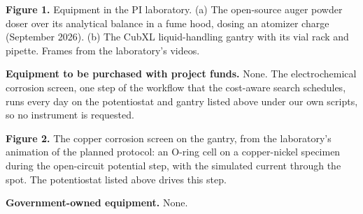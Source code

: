 \textbf{Figure 1.} Equipment in the PI laboratory. (a) The open-source auger
powder doser over its analytical balance in a fume hood, dosing an atomizer
charge (September 2026). (b) The CubXL liquid-handling gantry with its vial
rack and pipette. Frames from the laboratory's videos.

\textbf{Equipment to be purchased with project funds.} None. The
electrochemical corrosion screen, one step of the workflow that the
cost-aware search schedules, runs every day on the potentiostat and gantry
listed above under our own scripts, so no instrument is requested.

\textbf{Figure 2.} The copper corrosion screen on the gantry, from the
laboratory's animation of the planned protocol: an O-ring cell on a
copper-nickel specimen during the open-circuit potential step, with the
simulated current through the spot. The potentiostat listed above drives
this step.

\textbf{Government-owned equipment.} None.


